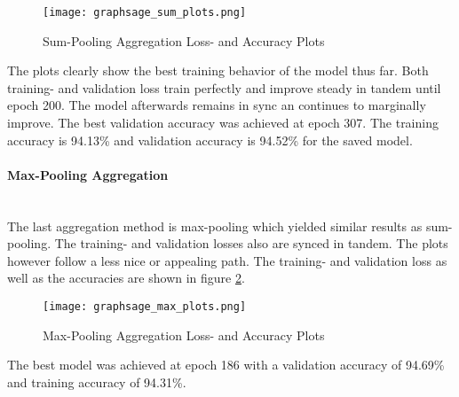   \begin{figure}[h]
		\centering
		\texttt{[image: graphsage\_sum\_plots.png]}
		\caption{Sum-Pooling Aggregation Loss- and Accuracy Plots}
        \label{fig:sum_aggregation}
  \end{figure}

  \noindent The plots clearly show the best training behavior of the model thus
  far. Both training- and validation loss train perfectly and improve steady in 
  tandem until epoch 200. The model afterwards remains in sync an continues to
  marginally improve. The best validation accuracy was achieved at epoch 307.
  The training accuracy is 94.13\% and validation accuracy is 94.52\% for the
  saved model. 

  \paragraph{Max-Pooling Aggregation}  \mbox{}\\ 
  The last aggregation method is max-pooling which yielded similar results as
  sum-pooling. The training- and validation losses also are synced in tandem.
  The plots however follow a less nice or appealing path. The training- and
  validation loss as well as the accuracies are shown in figure
  \ref{fig:max_aggregation}. 

  \begin{figure}[h]
		\centering
		\texttt{[image: graphsage\_max\_plots.png]}
		\caption{Max-Pooling Aggregation Loss- and Accuracy Plots}
        \label{fig:max_aggregation}
  \end{figure}

  \noindent The best model was achieved at epoch 186 with a validation accuracy
  of 94.69\% and training accuracy of 94.31\%. 
